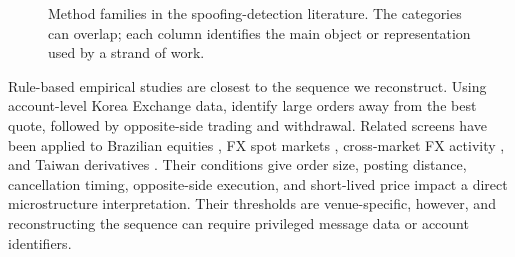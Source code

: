 \documentclass[11pt]{article}
\begin{document}
\begin{figure}[htbp]
    \caption{Method families in the spoofing-detection literature. The categories can overlap; each column identifies
    the main object or representation used by a strand of work.}
    \label{fig:method_taxonomy}
\end{figure}

Rule-based empirical studies are closest to the sequence we reconstruct. Using account-level Korea Exchange data, \cite{LeeEomPark2013} identify large orders away from the best quote, followed by opposite-side trading and withdrawal. Related screens have been applied to Brazilian equities \cite{MendoncaDeGenaro2020}, FX spot markets \cite{StenforsSusai2021}, cross-market FX activity \cite{StenforsEtAl2023}, and Taiwan derivatives \cite{ChenHsiehYang2026}. Their conditions give order size, posting distance, cancellation timing, opposite-side execution, and short-lived price impact a direct microstructure interpretation. Their thresholds are venue-specific, however, and reconstructing the sequence can require privileged message data or account identifiers.
\end{document}
